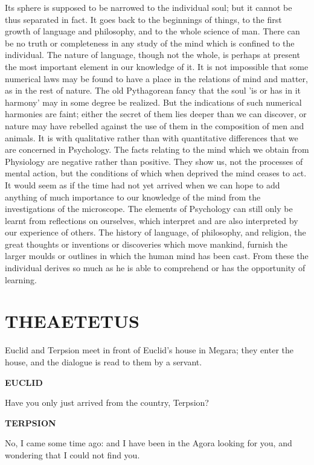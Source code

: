 \documentclass[11pt,letter]{article}
\begin{document}
\par  Its sphere is supposed to be narrowed to the individual soul; but it cannot be thus separated in fact. It goes back to the beginnings of things, to the first growth of language and philosophy, and to the whole science of man. There can be no truth or completeness in any study of the mind which is confined to the individual. The nature of language, though not the whole, is perhaps at present the most important element in our knowledge of it. It is not impossible that some numerical laws may be found to have a place in the relations of mind and matter, as in the rest of nature. The old Pythagorean fancy that the soul 'is or has in it harmony' may in some degree be realized. But the indications of such numerical harmonies are faint; either the secret of them lies deeper than we can discover, or nature may have rebelled against the use of them in the composition of men and animals. It is with qualitative rather than with quantitative differences that we are concerned in Psychology. The facts relating to the mind which we obtain from Physiology are negative rather than positive. They show us, not the processes of mental action, but the conditions of which when deprived the mind ceases to act. It would seem as if the time had not yet arrived when we can hope to add anything of much importance to our knowledge of the mind from the investigations of the microscope. The elements of Psychology can still only be learnt from reflections on ourselves, which interpret and are also interpreted by our experience of others. The history of language, of philosophy, and religion, the great thoughts or inventions or discoveries which move mankind, furnish the larger moulds or outlines in which the human mind has been cast. From these the individual derives so much as he is able to comprehend or has the opportunity of learning.

\par 
\section{
      THEAETETUS
    } 
\par  Euclid and Terpsion meet in front of Euclid's house in Megara; they enter the house, and the dialogue is read to them by a servant.

\par \textbf{EUCLID}
\par   Have you only just arrived from the country, Terpsion?

\par \textbf{TERPSION}
\par   No, I came some time ago:  and I have been in the Agora looking for you, and wondering that I could not find you.
\end{document}
